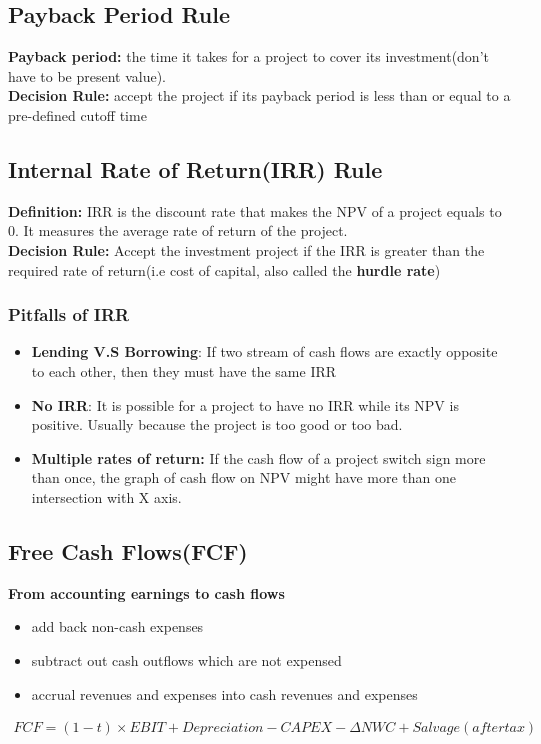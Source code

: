 \documentclass{article}
\theoremstyle{definition}
\theoremstyle{thrm}
\theoremstyle{lma}
\theoremstyle{ppst}
\theoremstyle{crlr}
\begin{document}
\subsection{Payback Period Rule}
\textbf{Payback period: }the time it takes for a project to cover its investment(don't have to be present value).\\
\textbf{Decision Rule: }accept the project if its payback period is less than or equal to a pre-defined cutoff time

\subsection{Internal Rate of Return(IRR) Rule}
\textbf{Definition:} IRR is the discount rate that makes the NPV of a project equals to 0. It measures the average rate of return of the project. \\
\textbf{Decision Rule: } Accept the investment project if the IRR is greater than the required rate of return(i.e cost of capital, also called the \textbf{hurdle rate})
\subsubsection{Pitfalls of IRR}
\begin{itemize}
	\item \textbf{Lending V.S Borrowing}: If two stream of cash flows are exactly opposite to each other, then they must have the same IRR
	\item \textbf{No IRR}: It is possible for a project to have no IRR while its NPV is positive. Usually because the project is too good or too bad. 
	\item \textbf{Multiple rates of return: }If the cash flow of a project switch sign more than once, the graph of cash flow on NPV might have more than one intersection with X axis. 
\end{itemize}

\subsection{Free Cash Flows(FCF)}
\textbf{From accounting earnings to cash flows}
\begin{itemize}
	\item add back non-cash expenses
	\item subtract out cash outflows which are not expensed
	\item accrual revenues and expenses into cash revenues and expenses
\end{itemize}
\begin{align*}
	FCF = (1-t)\times EBIT+Depreciation-CAPEX-\Delta NWC+Salvage(after tax)
\end{align*}
\end{document}
